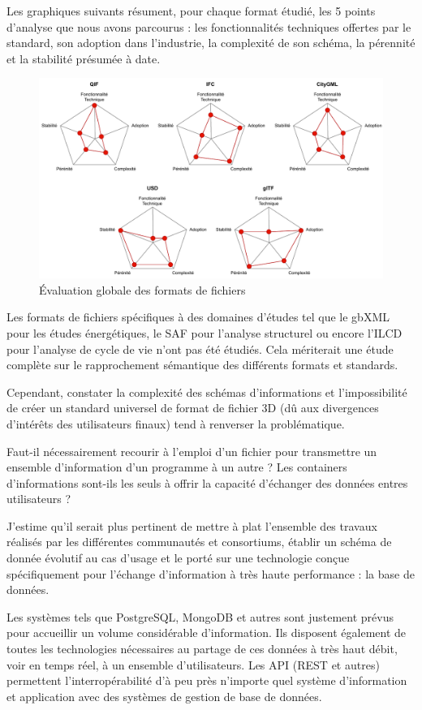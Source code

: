 \documentclass[a4paper,12pt]{article}
\begin{document}
Les graphiques suivants résument, pour chaque format étudié, les 5 points d'analyse que nous avons parcourus : les fonctionnalités techniques offertes par le standard, son adoption dans l'industrie, la complexité de son schéma, la pérennité et la stabilité présumée à date.

\begin{figure}
\centering
\includegraphics[width=.9\linewidth]{./imports/3DFiles_Evaluation.pdf}
\caption{\label{fig:org6374144}Évaluation globale des formats de fichiers}
\end{figure}

Les formats de fichiers spécifiques à des domaines d'études tel que le gbXML pour les études énergétiques, le SAF pour l'analyse structurel ou encore l'ILCD pour l'analyse de cycle de vie n'ont pas été étudiés. Cela mériterait une étude complète sur le rapprochement sémantique des différents formats et standards. 

Cependant, constater la complexité des schémas d'informations et l'impossibilité de créer un standard universel de format de fichier 3D (dû aux divergences d'intérêts des utilisateurs finaux) tend à renverser la problématique.

Faut-il nécessairement recourir à l'emploi d'un fichier pour transmettre un ensemble d'information d'un programme à un autre ?
Les containers d'informations sont-ils les seuls à offrir la capacité d'échanger des données entres utilisateurs ?

J'estime qu'il serait plus pertinent de mettre à plat l'ensemble des travaux réalisés par les différentes communautés et consortiums, établir un schéma de donnée évolutif au cas d'usage et le porté sur une technologie conçue spécifiquement pour l'échange d'information à très haute performance : la base de données.

Les systèmes tels que PostgreSQL, MongoDB et autres sont justement prévus pour accueillir un volume considérable d'information. Ils disposent également de toutes les technologies nécessaires au partage de ces données à très haut débit, voir en temps réel, à un ensemble d'utilisateurs. Les API (REST et autres) permettent l'interropérabilité d'à peu près n'importe quel système d'information et application avec des systèmes de gestion de base de données.
\end{document}
